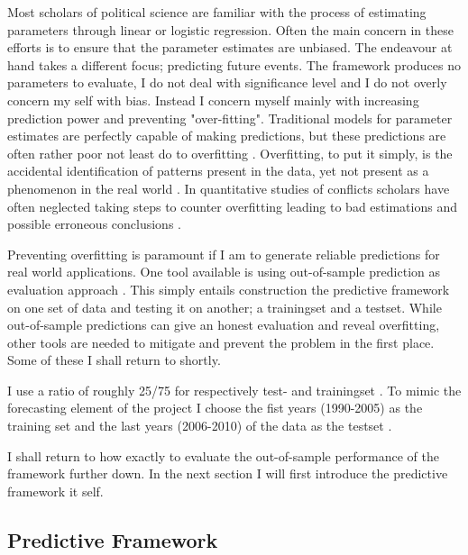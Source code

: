 \documentclass[a4paper]{article}
\begin{document}
Most scholars of political science are familiar with the process of estimating parameters through linear or logistic regression. Often the main concern in these efforts is to ensure that the parameter estimates are unbiased. The endeavour at hand takes a different focus; predicting future events. The framework produces no parameters to evaluate, I do not deal with significance level and I do not overly concern my self with bias. Instead I concern myself mainly with increasing prediction power and preventing "over-fitting". Traditional models for parameter estimates are perfectly capable of making predictions, but these predictions are often rather poor not least do to overfitting \citep{Ward_Greenhill_Bakke_2010}. Overfitting, to put it simply, is the accidental identification of patterns present in the data, yet not present as a phenomenon in the real world \citep[166-168]{Mcelreath_2018}. In quantitative studies of conflicts scholars have often neglected taking steps to counter overfitting leading to bad estimations and possible erroneous conclusions \citep{king_zeng_2001b, Ward_Greenhill_Bakke_2010}.\par

Preventing overfitting is paramount if I am to generate reliable predictions for real world applications. One tool available is using out-of-sample prediction as evaluation approach \citep{king_zeng_2001b, Ward_Greenhill_Bakke_2010, perry_2013, Schrodt_2014}. This simply entails construction the predictive framework on one set of data and testing it on another; a trainingset and a testset. While out-of-sample predictions can give an honest evaluation and reveal overfitting, other tools are needed to mitigate and prevent the problem in the first place. Some of these I shall return to shortly.\par

I use a ratio of roughly 25/75 for respectively test- and trainingset \citep{Friedman_2001, Ward_Greenhill_Bakke_2010}. To mimic the forecasting element of the project I choose the fist years (1990-2005) as the training set and the last years (2006-2010) of the data as the testset \citep{Goldstone_2010}.\par

I shall return to how exactly to evaluate the out-of-sample performance of the framework further down. In the next section I will first introduce the predictive framework it self.\par

\subsection{Predictive Framework}
\end{document}
